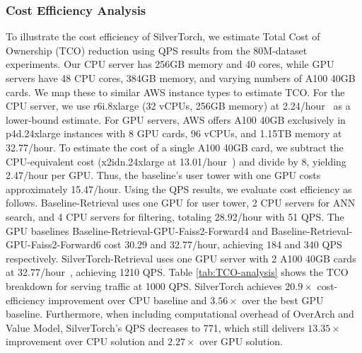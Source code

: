 \subsubsection{Cost Efficiency Analysis}
To illustrate the cost efficiency of SilverTorch, we estimate Total Cost of Ownership (TCO) reduction using QPS results from the 80M-dataset experiments. Our CPU server has 256GB memory and 40 cores, while GPU servers have 48 CPU cores, 384GB memory, and varying numbers of A100 40GB cards. We map these to similar AWS instance types to estimate TCO.
For the CPU server, we use r6i.8xlarge (32 vCPUs, 256GB memory) at 2.24/hour~\cite{r6i8xlarge} as a lower-bound estimate. For GPU servers, AWS offers A100 40GB exclusively in p4d.24xlarge instances with 8 GPU cards, 96 vCPUs, and 1.15TB memory at 32.77/hour. To estimate the cost of a single A100 40GB card, we subtract the CPU-equivalent cost (x2idn.24xlarge at 13.01/hour~\cite{x2idn24xlarge}) and divide by 8, yielding 2.47/hour per GPU. Thus, the baseline's user tower with one GPU costs approximately 15.47/hour.
Using the QPS results, we evaluate cost efficiency as follows. Baseline-Retrieval uses one GPU for user tower, 2 CPU servers for ANN search, and 4 CPU servers for filtering, totaling 28.92/hour with 51 QPS. The GPU baselines Baseline-Retrieval-GPU-Faiss2-Forward4 and Baseline-Retrieval-GPU-Faiss2-Forward6 cost 30.29 and 32.77/hour, achieving 184 and 340 QPS respectively. SilverTorch-Retrieval uses one GPU server with 2 A100 40GB cards at 32.77/hour~\cite{p4d24xlarge}, achieving 1210 QPS.
Table \ref{tab:TCO-analysis} shows the TCO breakdown for serving traffic at 1000 QPS. SilverTorch achieves $20.9\times$ cost-efficiency improvement over CPU baseline and $3.56\times$ over the best GPU baseline. Furthermore, when including computational overhead of OverArch and Value Model, SilverTorch's QPS decreases to 771, which still delivers $13.35\times$ improvement over CPU solution and $2.27\times$ over GPU solution.

